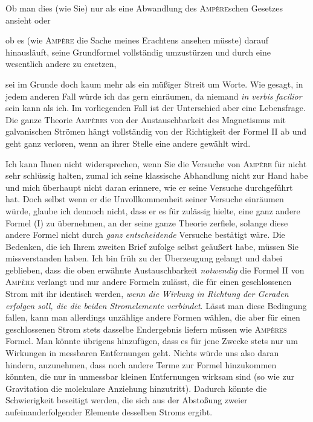 Ob man dies (wie Sie) nur als eine Abwandlung des \textsc{Ampère}schen Gesetzes ansieht oder

ob es (wie \textsc{Ampère} die Sache meines Erachtens ansehen müsste) darauf hinausläuft, seine Grundformel vollständig umzustürzen und durch eine wesentlich andere zu ersetzen,

sei im Grunde doch kaum mehr als ein müßiger Streit um Worte. Wie gesagt, in jedem anderen Fall würde ich das gern einräumen, da niemand \textit{in verbis facilior} sein kann als ich. Im vorliegenden Fall ist der Unterschied aber eine Lebensfrage. Die ganze Theorie \textsc{Ampères} von der Austauschbarkeit des Magnetismus mit galvanischen Strömen hängt vollständig von der Richtigkeit der Formel II ab und geht ganz verloren, wenn an ihrer Stelle eine andere gewählt wird.

Ich kann Ihnen nicht widersprechen, wenn Sie die Versuche von \textsc{Ampère} für nicht sehr schlüssig halten, zumal ich seine klassische Abhandlung nicht zur Hand habe und mich überhaupt nicht daran erinnere, wie er seine Versuche durchgeführt hat. Doch selbst wenn er die Unvollkommenheit seiner Versuche einräumen würde, glaube ich dennoch nicht, dass er es für zulässig hielte, eine ganz andere Formel (I) zu übernehmen, an der seine ganze Theorie zerfiele, solange diese andere Formel nicht durch \textit{ganz entscheidende} Versuche bestätigt wäre. Die Bedenken, die ich Ihrem zweiten Brief zufolge selbst geäußert habe, müssen Sie missverstanden haben. Ich bin früh zu der Überzeugung gelangt und dabei geblieben, dass die oben erwähnte Austauschbarkeit \textit{notwendig} die Formel II von \textsc{Ampère} verlangt und nur andere Formeln zulässt, die für einen geschlossenen Strom mit ihr identisch werden, \textit{wenn die Wirkung in Richtung der Geraden erfolgen soll, die die beiden Stromelemente verbindet}. Lässt man diese Bedingung fallen, kann man allerdings unzählige andere Formen wählen, die aber für einen geschlossenen Strom stets dasselbe Endergebnis liefern müssen wie \textsc{Ampères} Formel. Man könnte übrigens hinzufügen, dass es für jene Zwecke stets nur um Wirkungen in messbaren Entfernungen geht. Nichts würde uns also daran hindern, anzunehmen, dass noch andere Terme zur Formel hinzukommen könnten, die nur in unmessbar kleinen Entfernungen wirksam sind (so wie zur Gravitation die molekulare Anziehung hinzutritt). Dadurch könnte die Schwierigkeit beseitigt werden, die sich aus der Abstoßung zweier aufeinanderfolgender Elemente desselben Stroms ergibt.

